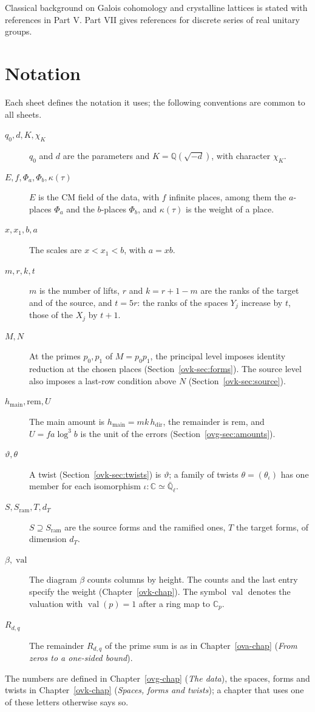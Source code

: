 \documentclass[reqno]{amsart}
\newcounter{chap}
\theoremstyle{definition}
\newcommand{\rem}{\mathrm{rem}}
\begin{document}
Classical background on Galois cohomology and crystalline lattices is stated
  with references in Part V.  Part VII gives references for discrete series
  of real unitary groups.

\section{Notation}\label{sec:notation}

Each sheet defines the notation it uses; the following conventions are
  common to all sheets.
\begin{description}
\item[\(q_0,d,K,\chi_K\)] \(q_0\) and \(d\) are the parameters and \(K =
  \mathbb{Q}(\sqrt{-d})\), with character \(\chi_K\).
\item[\(E,f,\Phi_a,\Phi_b,\kappa(\tau)\)] \(E\) is the CM field of the data,
  with \(f\) infinite places, among them the \(a\)-places \(\Phi_a\) and the
  \(b\)-places \(\Phi_b\), and \(\kappa(\tau)\) is the weight of a place.
\item[\(x,x_1,b,a\)] The scales are \(x < x_1 < b\), with \(a = xb\).
\item[\(m,r,k,t\)] \(m\) is the number of lifts, \(r\) and \(k = r + 1 - m\)
  are the ranks of the target and of the source, and \(t = 5r\): the ranks
  of the spaces \(Y_j\) increase by \(t\), those of the \(X_j\) by \(t +
  1\).
\item[\(M,N\)] At the primes \(p_0,p_1\) of \(M=p_0p_1\), the principal
  level imposes identity reduction at the chosen places
  (Section~\ref{ovk-sec:forms}).  The source level also imposes a last-row
  condition above \(N\) (Section~\ref{ovk-sec:source}).
\item[\(h_{\mathrm{main}},\rem,U\)] The main amount is \(h_{\mathrm{main}} =
  mk\,h_{\mathrm{dir}}\), the remainder is \(\rem\), and \(U = fa\log^3 b\)
  is the unit of the errors (Section~\ref{ovg-sec:amounts}).
\item[\(\vartheta,\theta\)] A twist (Section~\ref{ovk-sec:twists}) is \(\vartheta\); a family of twists
  \(\theta = (\theta_\iota)\) has one member for each isomorphism
  \(\iota\colon \mathbb{C} \simeq \bar{\mathbb{Q}}_\ell\).
\item[\(S,S_{\mathrm{ram}},T,d_T\)] \(S \supseteq S_{\mathrm{ram}}\) are the
  source forms and the ramified ones, \(T\) the target forms, of dimension
  \(d_T\).
\item[\(\beta,\operatorname{val}\)] The diagram \(\beta\) counts columns by
  height.  The counts and the last entry specify the weight
  (Chapter~\ref{ovk-chap}).  The symbol \(\operatorname{val}\) denotes the valuation with
  \(\operatorname{val}(p) = 1\) after a ring map to \(\mathbb{C}_p\).
\item[\(R_{d,q}\)] The remainder \(R_{d,q}\) of the prime sum is as in
  Chapter~\ref{ova-chap} (\emph{From zeros
  to a one-sided bound}).
\end{description}
The numbers are defined in
  Chapter~\ref{ovg-chap} (\emph{The data}), the
  spaces, forms and twists in
  Chapter~\ref{ovk-chap} (\emph{Spaces,
  forms and twists}); a chapter that uses one of these letters otherwise
  says so.
\end{document}
